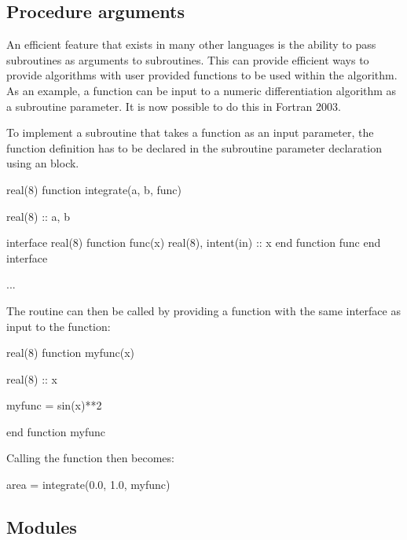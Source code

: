 \subsection{Procedure arguments}

An efficient feature that exists in many other languages is the ability to pass subroutines as arguments to subroutines. This can provide efficient ways to provide algorithms with user provided functions to be used within the algorithm. As an example, a function can be input to a numeric differentiation algorithm as a subroutine parameter. It is now possible to do this in Fortran 2003. 

To implement a subroutine that takes a function as an input parameter, the function definition has to be declared in the subroutine parameter declaration using an  block.

\begin{fortrancodeenv}
real(8) function integrate(a, b, func)

	real(8) :: a, b
	
	interface 
		real(8) function func(x)
			real(8), intent(in) :: x
		end function func
	end interface
	
	...
\end{fortrancodeenv}

The routine can then be called by providing a function with the same interface as input to the function:

\begin{fortrancodeenv}
real(8) function myfunc(x)
	
	real(8) :: x
	
	myfunc = sin(x)**2
	
end function myfunc
\end{fortrancodeenv}

Calling the  function then becomes:

\begin{fortrancodeenv}
area = integrate(0.0, 1.0, myfunc)
\end{fortrancodeenv}



\subsection{Modules}


